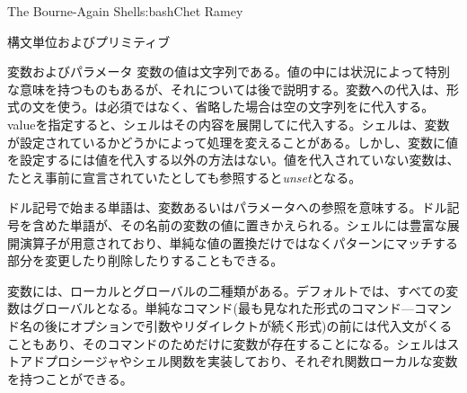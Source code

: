 \begin{aosachapter}{The Bourne-Again Shell}{s:bash}{Chet Ramey}
\begin{aosasect1}{構文単位およびプリミティブ}
\begin{aosasect2}{変数およびパラメータ}
変数の値は文字列である。値の中には状況によって特別な意味を持つものもあるが、それについては後で説明する。変数への代入は、形式の文を使う。は必須ではなく、省略した場合は空の文字列をに代入する。valueを指定すると、シェルはその内容を展開してに代入する。シェルは、変数が設定されているかどうかによって処理を変えることがある。しかし、変数に値を設定するには値を代入する以外の方法はない。値を代入されていない変数は、たとえ事前に宣言されていたとしても参照すると\emph{unset}となる。

ドル記号で始まる単語は、変数あるいはパラメータへの参照を意味する。ドル記号を含めた単語が、その名前の変数の値に置きかえられる。シェルには豊富な展開演算子が用意されており、単純な値の置換だけではなくパターンにマッチする部分を変更したり削除したりすることもできる。

変数には、ローカルとグローバルの二種類がある。デフォルトでは、すべての変数はグローバルとなる。単純なコマンド(最も見なれた形式のコマンド---コマンド名の後にオプションで引数やリダイレクトが続く形式)の前には代入文がくることもあり、そのコマンドのためだけに変数が存在することになる。シェルはストアドプロシージャやシェル関数を実装しており、それぞれ関数ローカルな変数を持つことができる。


\end{aosasect2}
\end{aosasect1}
\end{aosachapter}
